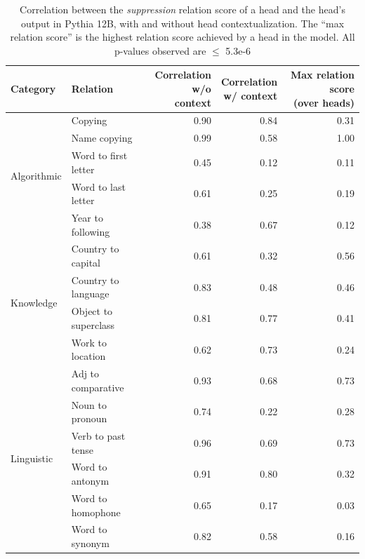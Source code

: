 \documentclass[11pt]{article}
\newcommand{\PythiaTwelveB}{Pythia 12B}
\begin{document}
\begin{table}[p]
\centering
\footnotesize

\begin{tabular}{llrrr}
\toprule
Category & Relation & \makecell{Correlation\\w/o context} & \makecell{Correlation\\w/ context} & \makecell{Max relation score\\(over heads)} \\
\midrule
\multirow{5}{*}{Algorithmic} & Copying & 0.90 & 0.84 & 0.31 \\
 & Name copying & 0.99 & 0.58 & 1.00 \\
 & Word to first letter & 0.45 & 0.12 & 0.11 \\
 & Word to last letter & 0.61 & 0.25 & 0.19 \\
 & Year to following & 0.38 & 0.67 & 0.12 \\
 \midrule
\multirow{4}{*}{Knowledge} & Country to capital & 0.61 & 0.32 & 0.56 \\
 & Country to language & 0.83 & 0.48 & 0.46 \\
 & Object to superclass & 0.81 & 0.77 & 0.41 \\
 & Work to location & 0.62 & 0.73 & 0.24 \\
 \midrule
\multirow{6}{*}{Linguistic} & Adj to comparative & 0.93 & 0.68 & 0.73 \\
 & Noun to pronoun & 0.74 & 0.22 & 0.28 \\
 & Verb to past tense & 0.96 & 0.69 & 0.73 \\
 & Word to antonym & 0.91 & 0.80 & 0.32 \\
 & Word to homophone & 0.65 & 0.17 & 0.03 \\
 & Word to synonym & 0.82 & 0.58 & 0.16 \\
\bottomrule
\end{tabular}


\caption{Correlation between the \emph{suppression} relation score of a head and the head's output in \PythiaTwelveB{}, with and without head contextualization. The ``max relation score'' is the highest relation score achieved by a head in the model. All p-values observed are $\leq$ 5.3e-6} 
\label{tab:Dynamic_results_pythia_12b_supression}
\end{table}
\end{document}
